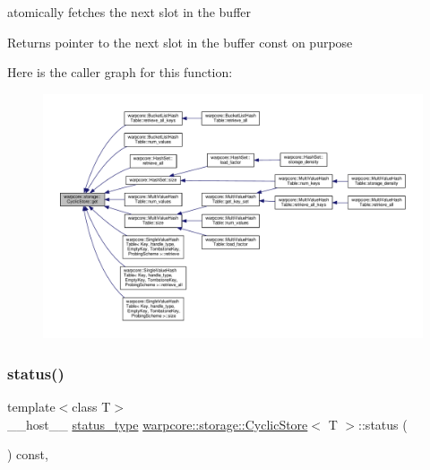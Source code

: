 atomically fetches the next slot in the buffer 

\begin{DoxyReturn}{Returns}
pointer to the next slot in the buffer  {\ttfamily const} on purpose 
\end{DoxyReturn}
Here is the caller graph for this function\+:
\nopagebreak
\begin{figure}[H]
\begin{center}
\leavevmode
\includegraphics[width=350pt]{classwarpcore_1_1storage_1_1CyclicStore_ab475e047f32b8a8358ea6b78dfe2536d_icgraph}
\end{center}
\end{figure}
\mbox{\label{classwarpcore_1_1storage_1_1CyclicStore_ab6c224b2b5a49d93dc7e052ec7b8cc32}} 
\subsubsection{\texorpdfstring{status()}{status()}}
{\footnotesize\ttfamily template$<$class T$>$ \\
\+\_\+\+\_\+host\+\_\+\+\_\+ \hyperlink{classwarpcore_1_1Status}{status\+\_\+type} \hyperlink{classwarpcore_1_1storage_1_1CyclicStore}{warpcore\+::storage\+::\+Cyclic\+Store}$<$ T $>$\+::status (\begin{DoxyParamCaption}{ }\end{DoxyParamCaption}) const\hspace{0.3cm}{\ttfamily [inline]}, {\ttfamily [noexcept]}}



